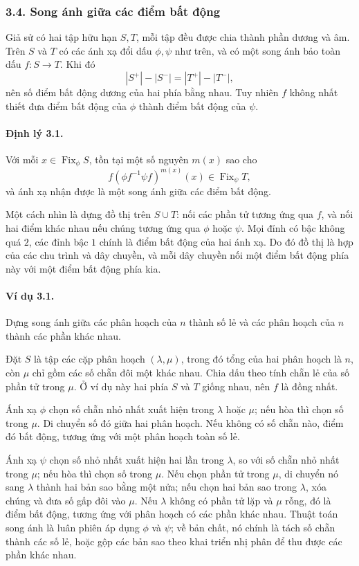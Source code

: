 \documentclass[11pt]{article}
\begin{document}
\subsubsection*{3.4. Song ánh giữa các điểm bất động}

Giả sử có hai tập hữu hạn \(S,T\), mỗi tập đều được chia thành phần dương và
âm. Trên \(S\) và \(T\) có các ánh xạ đổi dấu \(\phi,\psi\) như trên, và có
một song ánh bảo toàn dấu \(f:S\to T\). Khi đó
\[
|S^+|-|S^-|=|T^+|-|T^-|,
\]
nên số điểm bất động dương của hai phía bằng nhau. Tuy nhiên \(f\) không nhất
thiết đưa điểm bất động của \(\phi\) thành điểm bất động của \(\psi\).

\paragraph{Định lý 3.1.}
Với mỗi \(x\in\operatorname{Fix}_\phi S\), tồn tại một số nguyên \(m(x)\) sao
cho
\[
f(\phi f^{-1}\psi f)^{m(x)}(x)\in \operatorname{Fix}_\psi T,
\]
và ánh xạ nhận được là một song ánh giữa các điểm bất động.

Một cách nhìn là dựng đồ thị trên \(S\cup T\): nối các phần tử tương ứng qua
\(f\), và nối hai điểm khác nhau nếu chúng tương ứng qua \(\phi\) hoặc
\(\psi\). Mọi đỉnh có bậc không quá \(2\), các đỉnh bậc \(1\) chính là điểm
bất động của hai ánh xạ. Do đó đồ thị là hợp của các chu trình và dây chuyền,
và mỗi dây chuyền nối một điểm bất động phía này với một điểm bất động phía
kia.

\paragraph{Ví dụ 3.1.}
Dựng song ánh giữa các phân hoạch của \(n\) thành số lẻ và các phân hoạch của
\(n\) thành các phần khác nhau.

Đặt \(S\) là tập các cặp phân hoạch \((\lambda,\mu)\), trong đó tổng của hai
phân hoạch là \(n\), còn \(\mu\) chỉ gồm các số chẵn đôi một khác nhau. Chia
dấu theo tính chẵn lẻ của số phần tử trong \(\mu\). Ở ví dụ này hai phía \(S\)
và \(T\) giống nhau, nên \(f\) là đồng nhất.

Ánh xạ \(\phi\) chọn số chẵn nhỏ nhất xuất hiện trong \(\lambda\) hoặc \(\mu\);
nếu hòa thì chọn số trong \(\mu\). Di chuyển số đó giữa hai phân hoạch. Nếu
không có số chẵn nào, điểm đó bất động, tương ứng với một phân hoạch toàn số
lẻ.

Ánh xạ \(\psi\) chọn số nhỏ nhất xuất hiện hai lần trong \(\lambda\), so với số
chẵn nhỏ nhất trong \(\mu\); nếu hòa thì chọn số trong \(\mu\). Nếu chọn phần
tử trong \(\mu\), di chuyển nó sang \(\lambda\) thành hai bản sao bằng một nửa;
nếu chọn hai bản sao trong \(\lambda\), xóa chúng và đưa số gấp đôi vào
\(\mu\). Nếu \(\lambda\) không có phần tử lặp và \(\mu\) rỗng, đó là điểm bất
động, tương ứng với phân hoạch có các phần khác nhau. Thuật toán song ánh là
luân phiên áp dụng \(\phi\) và \(\psi\); về bản chất, nó chính là tách số chẵn
thành các số lẻ, hoặc gộp các bản sao theo khai triển nhị phân để thu được các
phần khác nhau.
\end{document}
